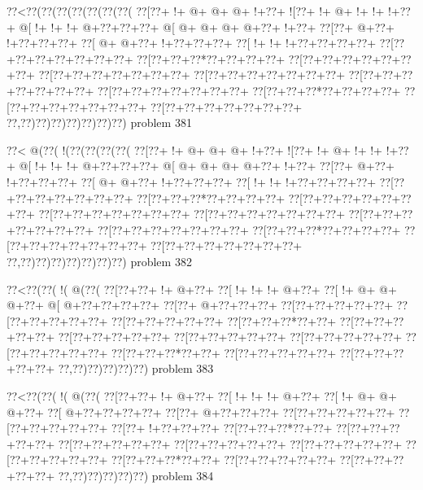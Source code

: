 \vbox{\vbox{\goo
\0??<\0??(\0??(\0??(\0??(\0??(\0??(\0??(
\0??[\0??+\- !+\- @+\- @+\- @+\- !+\0??+
\- ![\0??+\- !+\- @+\- !+\- !+\- !+\0??+
\- @[\- !+\- !+\- !+\- @+\0??+\0??+\0??+
\- @[\- @+\- @+\- @+\- @+\0??+\- !+\0??+
\0??[\0??+\- @+\0??+\- !+\0??+\0??+\0??+
\0??[\- @+\- @+\0??+\- !+\0??+\0??+\0??+
\0??[\- !+\- !+\- !+\0??+\0??+\0??+\0??+
\0??[\0??+\0??+\0??+\0??+\0??+\0??+\0??+
\0??[\0??+\0??+\0??*\0??+\0??+\0??+\0??+
\0??[\0??+\0??+\0??+\0??+\0??+\0??+\0??+
\0??[\0??+\0??+\0??+\0??+\0??+\0??+\0??+
\0??[\0??+\0??+\0??+\0??+\0??+\0??+\0??+
\0??[\0??+\0??+\0??+\0??+\0??+\0??+\0??+
\0??[\0??+\0??+\0??+\0??+\0??+\0??+\0??+
\0??[\0??+\0??+\0??*\0??+\0??+\0??+\0??+
\0??[\0??+\0??+\0??+\0??+\0??+\0??+\0??+
\0??[\0??+\0??+\0??+\0??+\0??+\0??+\0??+
\0??,\0??)\0??)\0??)\0??)\0??)\0??)\0??)
}
\hfil problem 381\hfil\break
}

\vbox{\vbox{\goo
\0??<\- @(\0??(\- !(\0??(\0??(\0??(\0??(
\0??[\0??+\- !+\- @+\- @+\- @+\- !+\0??+
\- ![\0??+\- !+\- @+\- !+\- !+\- !+\0??+
\- @[\- !+\- !+\- !+\- @+\0??+\0??+\0??+
\- @[\- @+\- @+\- @+\- @+\0??+\- !+\0??+
\0??[\0??+\- @+\0??+\- !+\0??+\0??+\0??+
\0??[\- @+\- @+\0??+\- !+\0??+\0??+\0??+
\0??[\- !+\- !+\- !+\0??+\0??+\0??+\0??+
\0??[\0??+\0??+\0??+\0??+\0??+\0??+\0??+
\0??[\0??+\0??+\0??*\0??+\0??+\0??+\0??+
\0??[\0??+\0??+\0??+\0??+\0??+\0??+\0??+
\0??[\0??+\0??+\0??+\0??+\0??+\0??+\0??+
\0??[\0??+\0??+\0??+\0??+\0??+\0??+\0??+
\0??[\0??+\0??+\0??+\0??+\0??+\0??+\0??+
\0??[\0??+\0??+\0??+\0??+\0??+\0??+\0??+
\0??[\0??+\0??+\0??*\0??+\0??+\0??+\0??+
\0??[\0??+\0??+\0??+\0??+\0??+\0??+\0??+
\0??[\0??+\0??+\0??+\0??+\0??+\0??+\0??+
\0??,\0??)\0??)\0??)\0??)\0??)\0??)\0??)
}
\hfil problem 382\hfil\break
}

\vbox{\vbox{\goo
\0??<\0??(\0??(\- !(\- @(\0??(
\0??[\0??+\0??+\- !+\- @+\0??+
\0??[\- !+\- !+\- !+\- @+\0??+
\0??[\- !+\- @+\- @+\- @+\0??+
\- @[\- @+\0??+\0??+\0??+\0??+
\0??[\0??+\- @+\0??+\0??+\0??+
\0??[\0??+\0??+\0??+\0??+\0??+
\0??[\0??+\0??+\0??+\0??+\0??+
\0??[\0??+\0??+\0??+\0??+\0??+
\0??[\0??+\0??+\0??*\0??+\0??+
\0??[\0??+\0??+\0??+\0??+\0??+
\0??[\0??+\0??+\0??+\0??+\0??+
\0??[\0??+\0??+\0??+\0??+\0??+
\0??[\0??+\0??+\0??+\0??+\0??+
\0??[\0??+\0??+\0??+\0??+\0??+
\0??[\0??+\0??+\0??*\0??+\0??+
\0??[\0??+\0??+\0??+\0??+\0??+
\0??[\0??+\0??+\0??+\0??+\0??+
\0??,\0??)\0??)\0??)\0??)\0??)
}
\hfil problem 383\hfil\break
}

\vbox{\vbox{\goo
\0??<\0??(\0??(\- !(\- @(\0??(
\0??[\0??+\0??+\- !+\- @+\0??+
\0??[\- !+\- !+\- !+\- @+\0??+
\0??[\- !+\- @+\- @+\- @+\0??+
\0??[\- @+\0??+\0??+\0??+\0??+
\0??[\0??+\- @+\0??+\0??+\0??+
\0??[\0??+\0??+\0??+\0??+\0??+
\0??[\0??+\0??+\0??+\0??+\0??+
\0??[\0??+\- !+\0??+\0??+\0??+
\0??[\0??+\0??+\0??*\0??+\0??+
\0??[\0??+\0??+\0??+\0??+\0??+
\0??[\0??+\0??+\0??+\0??+\0??+
\0??[\0??+\0??+\0??+\0??+\0??+
\0??[\0??+\0??+\0??+\0??+\0??+
\0??[\0??+\0??+\0??+\0??+\0??+
\0??[\0??+\0??+\0??*\0??+\0??+
\0??[\0??+\0??+\0??+\0??+\0??+
\0??[\0??+\0??+\0??+\0??+\0??+
\0??,\0??)\0??)\0??)\0??)\0??)
}
\hfil problem 384\hfil\break
}

